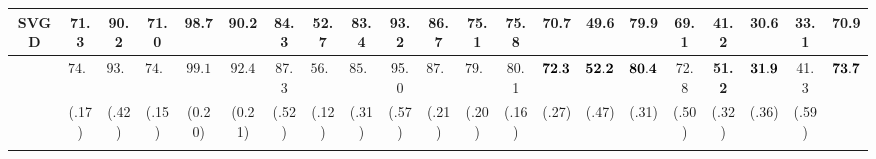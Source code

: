 \begin{table}[ht]
{\begin{tabular}{cccccccc|cccc|cccccccc|c}
  \rowcolor[HTML]{FFFFFF}
  \cellcolor[HTML]{FFFFFF}SVGD &
  71.3 &
  90.2 &
  71.0 &
  98.7 &
  90.2 &
  84.3 &
  52.7 &
  83.4 &
  93.2 &
  86.7 &
  75.1 &
  75.8 &
  70.7 &
  49.6 &
  79.9 &
  69.1 &
  41.2 &
  30.6 &
  33.1 &
  \cellcolor[HTML]{FFFFFF}70.9 \\ \hline
\rowcolor[HTML]{FFFFFF} 
 &
  \cellcolor[HTML]{9AFF99}$\mathbf{74.1}$ &
  \cellcolor[HTML]{9AFF99}$\mathbf{93.0}$ &
  \cellcolor[HTML]{9AFF99}$\mathbf{74.3}$ &
  \cellcolor[HTML]{9AFF99}$\mathbf{99.1}$ &
  \cellcolor[HTML]{9AFF99}$\mathbf{92.4}$ &
  87.3 & %
  \cellcolor[HTML]{9AFF99}$\mathbf{56.5}$ & %
  \cellcolor[HTML]{9AFF99}$\mathbf{85.3}$ &
  95.0 &
  \cellcolor[HTML]{9AFF99}$\mathbf{87.2}$ &
  \cellcolor[HTML]{9AFF99}$\mathbf{79.6}$ &
   80.1 &
  \cellcolor[HTML]{9AFF99}$\bf{72.3}$ & %
\cellcolor[HTML]{9AFF99}$\bf{52.2}$ & %
  \cellcolor[HTML]{9AFF99}$\bf{80.4}$ & %
   72.8& %
    \cellcolor[HTML]{9AFF99}\textbf{51.2}&
   \cellcolor[HTML]{9AFF99}$\bf{31.9}$&
   41.3& 
   
   
  \cellcolor[HTML]{9AFF99}$\bf{73.7}$ \\ 
 \rowcolor[HTML]{FFFFFF}
 \multirow{-2}{*}{\textbf{FHBI}}
  \cellcolor[HTML]{FFFFFF} &
    (.17)&
    (.42)&
    (.15)&
    (0.20)&
    (0.21)&
    (.52) &
    (.12)&
    (.31) &
    (.57) &
    (.21) &
    (.20) &
    (.16) &
    (.27) &
    (.47) &
    (.31) &
    (.50) &
    (.32) &
    (.36) &
    (.59) & 
    
  \cellcolor[HTML]{FFFFFF}\\ \hline
  \label{table: accuracy}
\end{tabular}
}
\end{table}
